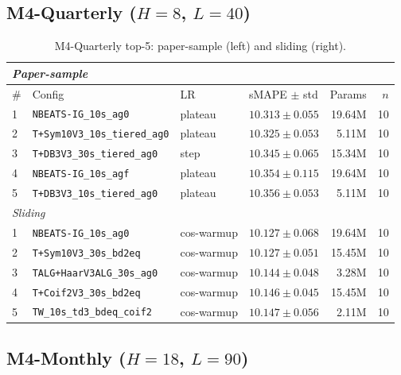 \documentclass[11pt,a4paper]{article}
\begin{document}
\subsection{\texorpdfstring{M4-Quarterly ($H=8$, $L=40$)}{M4-Quarterly (H=8, L=40)}}

\begin{table}[h]
\centering
\scriptsize
\setlength{\tabcolsep}{2.5pt}
\caption{M4-Quarterly top-5: paper-sample (left) and sliding (right).}
\label{tab:m4_quarterly_full}
\begin{tabular}{@{}llllrr@{}}
\toprule
\multicolumn{6}{l}{\textit{Paper-sample}} \\
\midrule
\# & Config & LR & sMAPE $\pm$ std & Params & $n$ \\
\midrule
1 & \texttt{NBEATS-IG\_10s\_ag0}            & plateau & $\mathbf{10.313 \pm 0.055}$ & 19.64M & 10 \\
2 & \texttt{T+Sym10V3\_10s\_tiered\_ag0}    & plateau & $10.325 \pm 0.053$          & 5.11M  & 10 \\
3 & \texttt{T+DB3V3\_30s\_tiered\_ag0}      & step    & $10.345 \pm 0.065$          & 15.34M & 10 \\
4 & \texttt{NBEATS-IG\_10s\_agf}            & plateau & $10.354 \pm 0.115$          & 19.64M & 10 \\
5 & \texttt{T+DB3V3\_10s\_tiered\_ag0}      & plateau & $10.356 \pm 0.053$          & 5.11M  & 10 \\
\midrule
\multicolumn{6}{l}{\textit{Sliding}} \\
\midrule
1 & \texttt{NBEATS-IG\_10s\_ag0}            & cos-warmup & $\mathbf{10.127 \pm 0.068}$ & 19.64M & 10 \\
2 & \texttt{T+Sym10V3\_30s\_bd2eq}          & cos-warmup & $10.127 \pm 0.051$          & 15.45M & 10 \\
3 & \texttt{TALG+HaarV3ALG\_30s\_ag0}       & cos-warmup & $10.144 \pm 0.048$          & 3.28M  & 10 \\
4 & \texttt{T+Coif2V3\_30s\_bd2eq}          & cos-warmup & $10.146 \pm 0.045$          & 15.45M & 10 \\
5 & \texttt{TW\_10s\_td3\_bdeq\_coif2}      & cos-warmup & $10.147 \pm 0.056$          & 2.11M  & 10 \\
\bottomrule
\end{tabular}
\end{table}

\subsection{\texorpdfstring{M4-Monthly ($H=18$, $L=90$)}{M4-Monthly (H=18, L=90)}}
\end{document}
